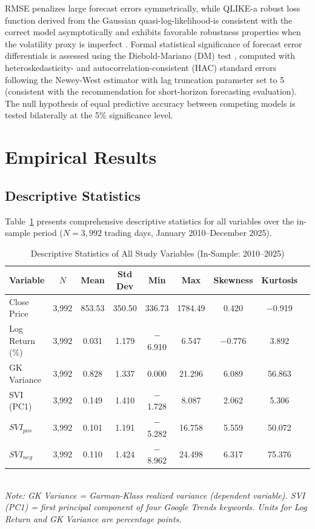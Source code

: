 \documentclass[12pt, a4paper]{article}
\begin{document}
RMSE penalizes large forecast errors symmetrically, while QLIKE-a robust loss function derived from the Gaussian quasi-log-likelihood-is consistent with the correct model asymptotically and exhibits favorable robustness properties when the volatility proxy is imperfect \citep{patton2011}. Formal statistical significance of forecast error differentials is assessed using the Diebold-Mariano (DM) test \citep{diebold1995}, computed with heteroskedasticity- and autocorrelation-consistent (HAC) standard errors following the Newey-West estimator \citep{newey1987} with lag truncation parameter set to 5 (consistent with the recommendation for short-horizon forecasting evaluation). The null hypothesis of equal predictive accuracy between competing models is tested bilaterally at the 5\% significance level.

\section{Empirical Results}

\subsection{Descriptive Statistics}

Table~\ref{tab:descriptive} presents comprehensive descriptive statistics for all variables over the in-sample period ($N = 3{,}992$ trading days, January 2010–December 2025).

\begin{table}[H]
\centering
\caption{Descriptive Statistics of All Study Variables (In-Sample: 2010–2025)}
\label{tab:descriptive}
\small
\begin{tabular}{lcccccccc}
\toprule
Variable & $N$ & Mean & Std Dev & Min & Max & Skewness & Kurtosis \\
\midrule
Close Price       & 3,992 & 853.53 & 350.50 & 336.73 & 1784.49 & 0.420 & $-$0.919 \\
Log Return (\%)   & 3,992 & 0.031  & 1.179  & $-$6.910 & 6.547 & $-$0.776 & 3.892 \\
GK Variance       & 3,992 & 0.828  & 1.337  & 0.000 & 21.296  & 6.089  & 56.863 \\
SVI (PC1)         & 3,992 & 0.149  & 1.410  & $-$1.728 & 8.087 & 2.062  & 5.306  \\
$SVI_{pos}$       & 3,992 & 0.101  & 1.191  & $-$5.282 & 16.758 & 5.559 & 50.072 \\
$SVI_{neg}$       & 3,992 & 0.110  & 1.424  & $-$8.962 & 24.498 & 6.317 & 75.376 \\
\bottomrule
\end{tabular}
\smallskip\\
\footnotesize\textit{Note: GK Variance = Garman-Klass realized variance (dependent variable). SVI (PC1) = first principal component of four Google Trends keywords. Units for Log Return and GK Variance are percentage points.}
\end{table}
\end{document}
